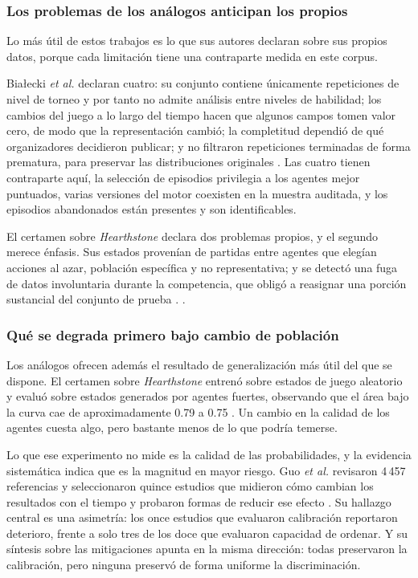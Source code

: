 \subsubsection{Los problemas de los análogos anticipan los propios}

Lo más útil de estos trabajos es lo que sus autores declaran sobre sus
propios datos, porque cada limitación tiene una contraparte medida en este
corpus.

Bia\l ecki \textit{et al.} declaran cuatro: su conjunto contiene únicamente
repeticiones de nivel de torneo y por tanto no admite análisis entre niveles
de habilidad; los cambios del juego a lo largo del tiempo hacen que algunos
campos tomen valor cero, de modo que la representación cambió; la
completitud dependió de qué organizadores decidieron publicar; y no
filtraron repeticiones terminadas de forma prematura, para preservar las
distribuciones originales \cite{bialecki_sc2egset_2023}. Las cuatro tienen
contraparte aquí, la selección de episodios privilegia a los agentes mejor
puntuados, varias versiones del motor coexisten en la muestra auditada, y
los episodios abandonados están presentes y son identificables.

El certamen sobre \emph{Hearthstone} declara dos problemas propios, y el
segundo merece énfasis. Sus estados provenían de partidas entre agentes que
elegían acciones al azar, población específica y no representativa; y se
detectó una fuga de datos involuntaria durante la competencia, que obligó a
reasignar una porción sustancial del conjunto de prueba
\cite{janusz_hearthstone_2017}. .

\subsubsection{Qué se degrada primero bajo cambio de población}

Los análogos ofrecen además el resultado de generalización más útil del que
se dispone. El certamen sobre \emph{Hearthstone} entrenó sobre estados de
juego aleatorio y evaluó sobre estados generados por agentes fuertes,
observando que el área bajo la curva cae de aproximadamente 0.79 a 0.75
\cite{janusz_hearthstone_2017}. Un cambio en la calidad de los agentes
cuesta algo, pero bastante menos de lo que podría temerse.

Lo que ese experimento no mide es la calidad de las probabilidades, y la
evidencia sistemática indica que es la magnitud en mayor riesgo. Guo
\textit{et al.} revisaron 4\,457 referencias y seleccionaron quince estudios
que midieron cómo cambian los resultados con el tiempo y probaron formas de
reducir ese efecto
\cite{guo_temporalshift_2021}. Su hallazgo central es una asimetría: los
once estudios que evaluaron calibración reportaron deterioro, frente a solo
tres de los doce que evaluaron capacidad de ordenar. Y su síntesis sobre las
mitigaciones apunta en la misma dirección: todas preservaron la calibración,
pero ninguna preservó de forma uniforme la discriminación.

